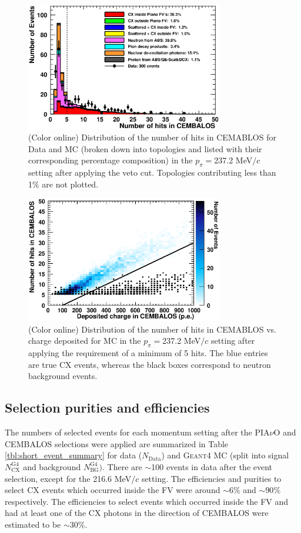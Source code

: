 \begin{figure}[ht]
 \includegraphics[width=86mm]{figures/duettag_nhits_20000_forpaper_v3.eps}
 \caption{(Color online) Distribution of the number of hits in CEMABLOS for Data and MC {\color{red}(broken down into topologies and listed with their corresponding percentage composition)} in the $p_\pi=$237.2 MeV$/c$ setting after applying the veto cut. Topologies contributing less than 1\% are not plotted.}
 \label{fig:nhits}
\end{figure}

\begin{figure}[ht]
 \includegraphics[width=86mm]{figures/draw2Dcut_draw.eps}
 \caption{(Color online) Distribution of the number of hits in CEMABLOS vs. charge deposited for MC in the $p_\pi=$237.2 MeV$/c$ setting after applying the requirement of a minimum of 5 hits. The blue entries are true CX events, whereas the black boxes correspond to neutron background events.}
 \label{fig:nhitsvsCharge}
\end{figure}

\subsection{Selection purities and efficiencies}
The numbers of selected events for each momentum setting after the PIA$\nu$O and CEMBALOS selections were applied are summarized in Table \ref{tbl:short_event_summary} for data ($N_{\mathrm{Data}}$) and {\color{red} \textsc{Geant4} MC (split into signal $N_{\mathrm{CX}}^{\mathrm{G4}}$ and background $N_{\mathrm{BG}}^{\mathrm{G4}})$}. There are $\sim$100 events in data after the event selection, except for the 216.6 MeV$/c$ setting. The efficiencies and purities to select CX events which occurred inside the FV were around $\sim6\%$ and $\sim90\%$ respectively. {\color{red} The efficiencies to select events which occurred inside the FV and had at least one of the CX photons in the direction of CEMBALOS were estimated to be $\sim30\%$.}


